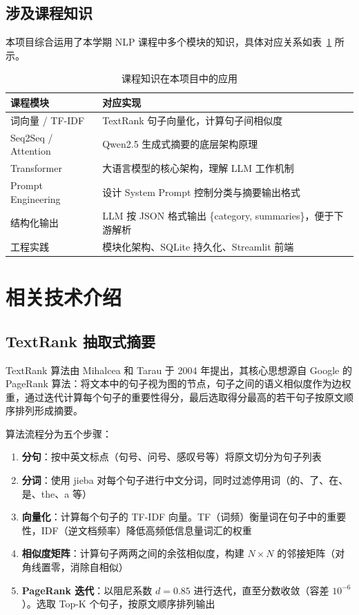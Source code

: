 \documentclass[12pt,a4paper]{ctexart}
\begin{document}
\subsection{涉及课程知识}

本项目综合运用了本学期 NLP 课程中多个模块的知识，具体对应关系如表~\ref{tab:knowledge} 所示。

\begin{table}[H]
\centering
\caption{课程知识在本项目中的应用}
\label{tab:knowledge}
\small
\begin{tabular}{ll}
\toprule
\textbf{课程模块} & \textbf{对应实现} \\
\midrule
词向量 / TF-IDF   & TextRank 句子向量化，计算句子间相似度 \\
Seq2Seq / Attention & Qwen2.5 生成式摘要的底层架构原理 \\
Transformer       & 大语言模型的核心架构，理解 LLM 工作机制 \\
Prompt Engineering & 设计 System Prompt 控制分类与摘要输出格式 \\
结构化输出        & LLM 按 JSON 格式输出 \{category, summaries\}，便于下游解析 \\
工程实践          & 模块化架构、SQLite 持久化、Streamlit 前端 \\
\bottomrule
\end{tabular}
\end{table}

\section{相关技术介绍}

\subsection{TextRank 抽取式摘要}

TextRank 算法由 Mihalcea 和 Tarau 于 2004 年提出\cite{textrank}，其核心思想源自 Google 的 PageRank 算法\cite{pagerank}：将文本中的句子视为图的节点，句子之间的语义相似度作为边权重，通过迭代计算每个句子的重要性得分，最后选取得分最高的若干句子按原文顺序排列形成摘要。

算法流程分为五个步骤：

\begin{enumerate}[label=步骤 \arabic*:,nosep]
    \item \textbf{分句}：按中英文标点（句号、问号、感叹号等）将原文切分为句子列表
    \item \textbf{分词}：使用 jieba 对每个句子进行中文分词，同时过滤停用词（的、了、在、是、the、a 等）
    \item \textbf{向量化}：计算每个句子的 TF-IDF 向量。TF（词频）衡量词在句子中的重要性，IDF（逆文档频率）降低高频低信息量词汇的权重
    \item \textbf{相似度矩阵}：计算句子两两之间的余弦相似度，构建 $N \times N$ 的邻接矩阵（对角线置零，消除自相似）
    \item \textbf{PageRank 迭代}：以阻尼系数 $d = 0.85$ 进行迭代，直至分数收敛（容差 $10^{-6}$）。选取 Top-K 个句子，按原文顺序排列输出
\end{enumerate}
\end{document}
